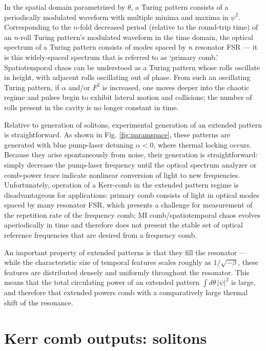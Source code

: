 In the spatial domain parametrized by $\theta$, a Turing pattern consists of a periodically modulated waveform with multiple minima and maxima in $\psi^2$. Corresponding to the $n$-fold decreased period (relative to the round-trip time) of an $n$-roll Turing pattern's modulated waveform in the time domain, the optical spectrum of a Turing pattern consists of modes spaced by $n$ resonator FSR --- it is this widely-spaced spectrum that is referred to as `primary comb.' Spatiotemporal chaos can be understood as a Turing pattern whose rolls oscillate in height, with adjacent rolls oscillating out of phase. From such an oscillating Turing pattern, if $\alpha$ and/or $F^2$ is increased, one moves deeper into the chaotic regime and pulses begin to exhibit lateral motion and collisions; the number of rolls present in the cavity is no longer constant in time.

Relative to generation of solitons, experimental generation of an extended pattern is straightforward. As shown in Fig. \ref{fig:paramspace}, these patterns are generated with blue pump-laser detuning $\alpha<0$, where thermal locking occurs. Because they arise spontaneously from noise, their generation is straightforward: simply decrease the pump-laser frequency until the optical spectrum analyzer or comb-power trace indicate nonlinear conversion of light to new frequencies. Unfortunately, operation of a Kerr-comb in the extended pattern regime is disadvantageous for applications: primary comb consists of light in optical modes spaced by many resonator FSR, which presents a challenge for measurement of the repetition rate of the frequency comb; MI comb/spatiotemporal chaos evolves aperiodically in time and therefore does not present the stable set of optical reference frequencies that are desired from a frequency comb. 

An important property of extended patterns is that they fill the resonator --- while the characteristic size of temporal features scales roughly as $1/\sqrt{-\beta}$, these features are distributed densely and uniformly throughout the resonator. This means that the total circulating power of an extended pattern $\int d\theta\, |\psi|^2$ is large, and therefore that extended powers comb with a comparatively large thermal shift of the resonance. 



\section{Kerr comb outputs: solitons}

